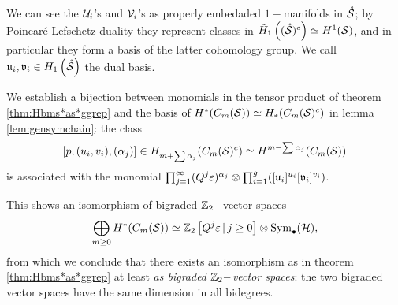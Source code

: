 
\begin{defn}
 \label{defn:dualHbasis}
We can see the $\mathcal{U}_i$'s and $\mathcal{V}_i$'s as properly embedaded $1-$manifolds in $\mathring{\mathcal{S}}$;
by Poincaré-Lefschetz duality they represent classes in $\tilde{H}_1\left((\mathring{\mathcal{S}})^c\right)\simeq H^1(\mathcal{S})$,
and in particular they form a basis
of the latter cohomology group. We call $\mathfrak{u}_i,\mathfrak{v}_i\in H_1\left(\mathring{\mathcal{S}}\right)$ the dual basis.

\end{defn}
We establish a bijection between monomials in the tensor product of theorem  \ref{thm:Hbms*as*ggrep}
and the basis of $H^*(C_m(\mathcal{S}))\simeq H_*(C_m(\mathcal{S})^c)$ in lemma \ref{lem:gensymchain}:
the class 
\[
[p,(u_i,v_i),(\alpha_j)]\in H_{m+\sum\alpha_j}(C_m(\mathcal{S})^c)\simeq H^{m-\sum\alpha_j}(C_m(\mathcal{S}))
\]
is associated with the monomial $\prod_{j=1}^{\infty}(Q^j\varepsilon)^{\alpha_j}\otimes \prod_{i=1}^g([\mathfrak{u}_i]^{u_i}[\mathfrak{v}_i]^{v_i})$.

This shows an isomorphism of bigraded $\mathbb{Z}_2-$vector spaces
\begin{equation}\label{eq:isovectorspaces}
  \bigoplus_{m\geq 0} H^*(C_m(\mathcal{S}))\simeq \mathbb{Z}_2\left[Q^j\varepsilon\,|\, j\geq 0\right]\otimes\operatorname{Sym}_{\bullet}(\mathcal{H}),
\end{equation}
from which we conclude that
there exists an isomorphism as in theorem \ref{thm:Hbms*as*ggrep}
at least \emph{as bigraded $\mathbb{Z}_2-$vector spaces}: the two bigraded
vector spaces have the same dimension in all bidegrees.